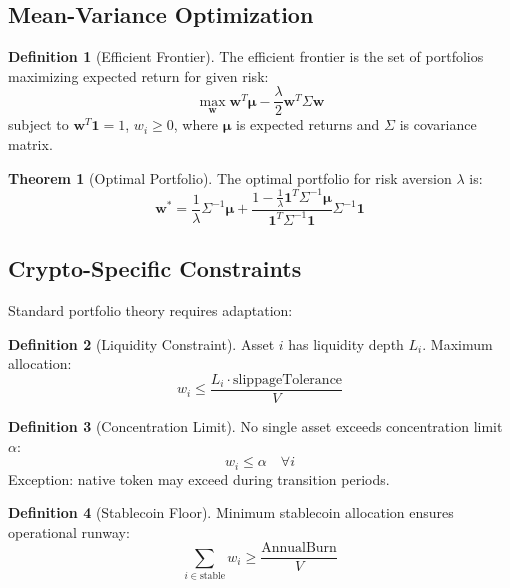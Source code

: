 \documentclass[11pt,a4paper]{article}
\theoremstyle{definition}
\newtheorem{definition}{Definition}[section]
\newtheorem{theorem}{Theorem}[section]
\theoremstyle{remark}
\begin{document}
\subsection{Mean-Variance Optimization}

\begin{definition}[Efficient Frontier]
The efficient frontier is the set of portfolios maximizing expected return for given risk:
\begin{equation}
    \max_{\mathbf{w}} \mathbf{w}^T \boldsymbol{\mu} - \frac{\lambda}{2} \mathbf{w}^T \Sigma \mathbf{w}
\end{equation}
subject to $\mathbf{w}^T \mathbf{1} = 1$, $w_i \geq 0$, where $\boldsymbol{\mu}$ is expected returns and $\Sigma$ is covariance matrix.
\end{definition}

\begin{theorem}[Optimal Portfolio]
The optimal portfolio for risk aversion $\lambda$ is:
\begin{equation}
    \mathbf{w}^* = \frac{1}{\lambda} \Sigma^{-1} \boldsymbol{\mu} + \frac{1 - \frac{1}{\lambda} \mathbf{1}^T \Sigma^{-1} \boldsymbol{\mu}}{\mathbf{1}^T \Sigma^{-1} \mathbf{1}} \Sigma^{-1} \mathbf{1}
\end{equation}
\end{theorem}

\subsection{Crypto-Specific Constraints}

Standard portfolio theory requires adaptation:

\begin{definition}[Liquidity Constraint]
Asset $i$ has liquidity depth $L_i$. Maximum allocation:
\begin{equation}
    w_i \leq \frac{L_i \cdot \text{slippageTolerance}}{V}
\end{equation}
\end{definition}

\begin{definition}[Concentration Limit]
No single asset exceeds concentration limit $\alpha$:
\begin{equation}
    w_i \leq \alpha \quad \forall i
\end{equation}
Exception: native token may exceed during transition periods.
\end{definition}

\begin{definition}[Stablecoin Floor]
Minimum stablecoin allocation ensures operational runway:
\begin{equation}
    \sum_{i \in \text{stable}} w_i \geq \frac{\text{AnnualBurn}}{V}
\end{equation}
\end{definition}
\end{document}
